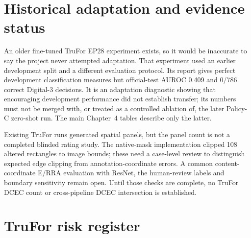 \section{Historical adaptation and evidence status}

An older fine-tuned TruFor EP28 experiment exists, so it would be inaccurate to say the project never attempted adaptation. That experiment used an earlier development split and a different evaluation protocol. Its report gives perfect development classification measures but official-test AUROC 0.409 and 0/786 correct Digital-3 decisions. It is an adaptation diagnostic showing that encouraging development performance did not establish transfer; its numbers must not be merged with, or treated as a controlled ablation of, the later Policy-C zero-shot run. The main Chapter~4 tables describe only the latter.

Existing TruFor runs generated spatial panels, but the panel count is not a completed blinded rating study. The native-mask implementation clipped 108 altered rectangles to image bounds; these need a case-level review to distinguish expected edge clipping from annotation-coordinate errors. A common content-coordinate E/RRA evaluation with ResNet, the human-review labels and boundary sensitivity remain open. Until those checks are complete, no TruFor DCEC count or cross-pipeline DCEC intersection is established.

\section{TruFor risk register}

